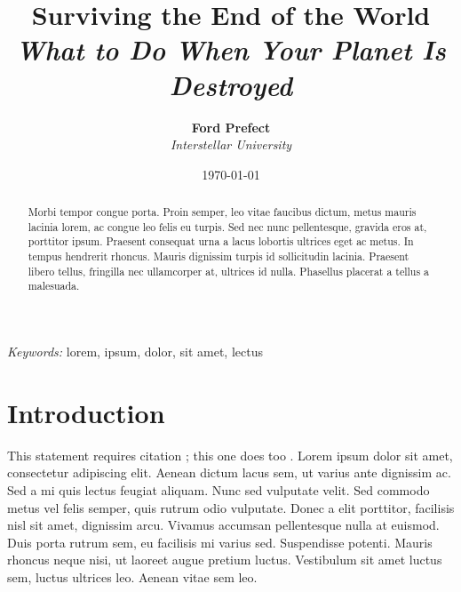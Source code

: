 \documentclass[
  UTF8, %
  12pt, %
]{essay} %
\title{
  \textbf{Surviving the End of the World} \\
  {\Large\itshape What to Do When Your Planet Is Destroyed} \\
} %
\author{
  \textbf{Ford Prefect} \\
  \textit{Interstellar University}
} %
\date{\today} %
\begin{document}
\maketitle %



\begin{abstract}
  Morbi tempor congue porta. Proin semper, leo vitae faucibus dictum, metus mauris lacinia lorem, ac congue leo felis eu turpis. Sed nec nunc pellentesque, gravida eros at, porttitor ipsum. Praesent consequat urna a lacus lobortis ultrices eget ac metus. In tempus hendrerit rhoncus. Mauris dignissim turpis id sollicitudin lacinia. Praesent libero tellus, fringilla nec ullamcorper at, ultrices id nulla. Phasellus placerat a tellus a malesuada.
\end{abstract}

\hspace*{3.6mm}\textit{Keywords:} lorem, ipsum, dolor, sit amet, lectus %

\vspace{30pt} %


\section*{Introduction}

This statement requires citation \cite{Smith:2012qr}; this one does too \cite{Smith:2013jd}. Lorem ipsum dolor sit amet, consectetur adipiscing elit. Aenean dictum lacus sem, ut varius ante dignissim ac. Sed a mi quis lectus feugiat aliquam. Nunc sed vulputate velit. Sed commodo metus vel felis semper, quis rutrum odio vulputate. Donec a elit porttitor, facilisis nisl sit amet, dignissim arcu. Vivamus accumsan pellentesque nulla at euismod. Duis porta rutrum sem, eu facilisis mi varius sed. Suspendisse potenti. Mauris rhoncus neque nisi, ut laoreet augue pretium luctus. Vestibulum sit amet luctus sem, luctus ultrices leo. Aenean vitae sem leo.
\end{document}
